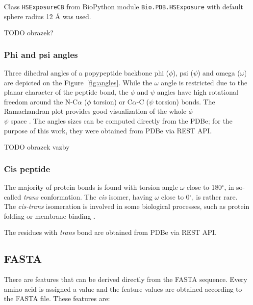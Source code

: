 Class \texttt{HSExposureCB} from BioPython module \texttt{Bio.PDB.HSExposure} with default sphere radius 12 {\AA} was used. 

TODO obrazek?


\subsubsection{Phi and psi angles}

Three dihedral angles of a popypeptide backbone phi ($\phi$), psi ($\psi$) and omega ($\omega$) are depicted on the Figure~\ref{fig:angles}. While the $\omega$ angle is restricted due to the planar character of the peptide bond, the $\phi$ and $\psi$ angles have high rotational freedom around the N-C$\alpha$ ($\phi$ torsion) or C$\alpha$-C ($\psi$ torsion) bonds. The Ramachandran plot provides good visualization of the whole $\phi$\\$\psi$ space \cite{ramachandran}.
The angles sizes can be computed directly from the PDBe; for the purpose of this work, they were obtained from PDBe via REST API.

TODO obrazek vazby

\subsubsection{Cis peptide}

The majority of protein bonds is found with torsion angle $\omega$ close to 180$^\circ$, in so-called \textit{trans} conformation. The \textit{cis} isomer, having $\omega$ close to 0$^\circ$, is rather rare. The \textit{cis-trans} isomeration is involved in some biological processes, such as protein folding or membrane binding \cite{cispeptide}.

The residues with \textit{trans} bond are obtained from PDBe via REST API.


\subsection{FASTA}

There are features that can be derived directly from the FASTA sequence. Every amino acid is assigned a value and the feature values are obtained according to the FASTA file. These features are:

